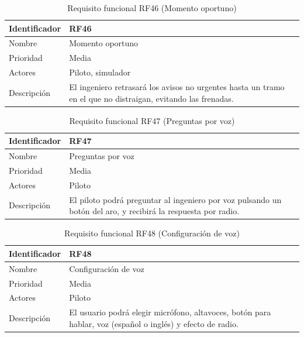\begin{table}[H]
	\centering
	\renewcommand{\arraystretch}{2}
	\begin{tabular}{|l|p{10cm}|}
		\hline
		Identificador & RF46 \\
		\hline
		Nombre & Momento oportuno \\
		\hline
		Prioridad & Media \\
		\hline
		Actores & Piloto, simulador \\
		\hline
		Descripción & El ingeniero retrasará los avisos no urgentes hasta un tramo en el que no distraigan, evitando las frenadas. \\
		\hline
	\end{tabular}
	\caption{Requisito funcional RF46 (Momento oportuno)}
	\label{tab:rf46}
\end{table}

\begin{table}[H]
	\centering
	\renewcommand{\arraystretch}{2}
	\begin{tabular}{|l|p{10cm}|}
		\hline
		Identificador & RF47 \\
		\hline
		Nombre & Preguntas por voz \\
		\hline
		Prioridad & Media \\
		\hline
		Actores & Piloto \\
		\hline
		Descripción & El piloto podrá preguntar al ingeniero por voz pulsando un botón del aro, y recibirá la respuesta por radio. \\
		\hline
	\end{tabular}
	\caption{Requisito funcional RF47 (Preguntas por voz)}
	\label{tab:rf47}
\end{table}

\begin{table}[H]
	\centering
	\renewcommand{\arraystretch}{2}
	\begin{tabular}{|l|p{10cm}|}
		\hline
		Identificador & RF48 \\
		\hline
		Nombre & Configuración de voz \\
		\hline
		Prioridad & Media \\
		\hline
		Actores & Piloto \\
		\hline
		Descripción & El usuario podrá elegir micrófono, altavoces, botón para hablar, voz (español o inglés) y efecto de radio. \\
		\hline
	\end{tabular}
	\caption{Requisito funcional RF48 (Configuración de voz)}
	\label{tab:rf48}
\end{table}

